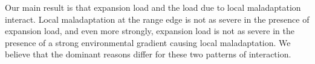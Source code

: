 

Our main result is that expansion load and the load due to local maladaptation interact. Local maladaptation at the range edge is not as severe in the presence of expansion load, and even more strongly, expansion load is not as severe in the presence of a strong environmental gradient causing local maladaptation. %
We believe that the dominant reasons differ for these two patterns of interaction. 


